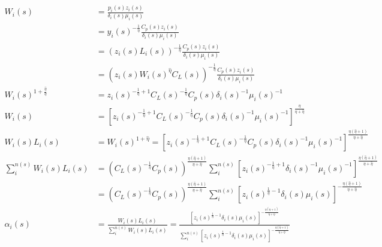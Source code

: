 \begin{align}
    W_i(s) &= \frac{p_i(s)z_i(s)}{\delta_i(s)\mu_i(s)}\\
    &= y_i(s)^{-\frac{1}{\eta}} \frac{C_p(s) z_i(s)}{\delta_i(s)\mu_i(s)}\\
    &= (z_i(s)L_i(s))^{-\frac{1}{\eta}}\frac{C_p(s) z_i(s)}{\delta_i(s)\mu_i(s)}\\
    &= (z_i(s) W_i(s)^{\hat{\eta}} C_L(s))^{-\frac{1}{\eta}}\frac{C_p(s) z_i(s)}{\delta_i(s)\mu_i(s)}\\
    W_i(s)^{1+\frac{\hat{\eta}}{\eta}} &= z_i(s)^{-\frac{1}{\eta}+1}C_L(s)^{-\frac{1}{\eta}}C_p(s) \delta_i(s)^{-1}\mu_i(s)^{-1}\\
    W_i(s) &= [z_i(s)^{-\frac{1}{\eta}+1}C_L(s)^{-\frac{1}{\eta}}C_p(s) \delta_i(s)^{-1}\mu_i(s)^{-1}]^{\frac{\eta}{\eta+\hat{\eta}}}\\
    W_i(s) L_i(s) &= W_i(s)^{1+\hat{\eta}}= [z_i(s)^{-\frac{1}{\eta}+1}C_L(s)^{-\frac{1}{\eta}}C_p(s) \delta_i(s)^{-1}\mu_i(s)^{-1}]^{\frac{\eta(\hat{\eta}+1)}{\eta+\hat{\eta}}}\\
    \sum_i^{n(s)}W_i(s) L_i(s) &= (C_L(s)^{-\frac{1}{\eta}}C_p(s))^{\frac{\eta(\hat{\eta}+1)}{\eta+\hat{\eta}}} \sum_i^{n(s)} [z_i(s)^{-\frac{1}{\eta}+1}\delta_i(s)^{-1}\mu_i(s)^{-1}]^{\frac{\eta(\hat{\eta}+1)}{\eta+\hat{\eta}}}  \\
    &= (C_L(s)^{-\frac{1}{\eta}}C_p(s))^{\frac{\eta(\hat{\eta}+1)}{\eta+\hat{\eta}}} \sum_i^{n(s)} [z_i(s)^{\frac{1}{\eta}-1}\delta_i(s)\mu_i(s)]^{-\frac{\eta(\hat{\eta}+1)}{\eta+\hat{\eta}}}\\
    \alpha_i(s) &= \frac{W_i(s) L_i(s)}{\sum_i^{n(s)}W_i(s) L_i(s)}=\frac{[z_i(s)^{\frac{1}{\eta}-1}\delta_i(s)\mu_i(s)]^{-\frac{\eta(\hat{\eta}+1)}{\eta+\hat{\eta}}}}{\sum_i^{n(s)} [z_i(s)^{\frac{1}{\eta}-1}\delta_i(s)\mu_i(s)]^{-\frac{\eta(\hat{\eta}+1)}{\eta+\hat{\eta}}}}
\end{align}




